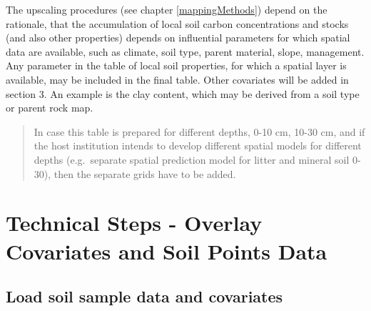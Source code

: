\documentclass[10pt,b5paper,]{book}
\newenvironment{Shaded}{\begin{snugshade}}{\end{snugshade}}
\newcommand{\CommentTok}[1]{\textcolor[rgb]{0.56,0.35,0.01}{\textit{#1}}}
\newcommand{\DataTypeTok}[1]{\textcolor[rgb]{0.13,0.29,0.53}{#1}}
\newcommand{\KeywordTok}[1]{\textcolor[rgb]{0.13,0.29,0.53}{\textbf{#1}}}
\newcommand{\NormalTok}[1]{#1}
\newcommand{\OtherTok}[1]{\textcolor[rgb]{0.56,0.35,0.01}{#1}}
\newcommand{\StringTok}[1]{\textcolor[rgb]{0.31,0.60,0.02}{#1}}
\theoremstyle{definition}
\theoremstyle{definition}
\theoremstyle{definition}
\theoremstyle{remark}
\begin{document}
The upscaling procedures (see chapter \ref{mappingMethods}) depend on
the rationale, that the accumulation of local soil carbon concentrations
and stocks (and also other properties) depends on influential parameters
for which spatial data are available, such as climate, soil type, parent
material, slope, management. Any parameter in the table of local soil
properties, for which a spatial layer is available, may be included in
the final table. Other covariates will be added in section 3. An example
is the clay content, which may be derived from a soil type or parent
rock map.

\begin{quote}
In case this table is prepared for different depths, 0-10 cm, 10-30 cm,
and if the host institution intends to develop different spatial models
for different depths (e.g.~separate spatial prediction model for litter
and mineral soil 0-30), then the separate grids have to be added.
\end{quote}

\hypertarget{overlay-soil-covariates}{%
\section{Technical Steps - Overlay Covariates and Soil Points
Data}\label{overlay-soil-covariates}}

\hypertarget{load-soil-sample-data-and-covariates}{%
\subsection{Load soil sample data and
covariates}\label{load-soil-sample-data-and-covariates}}

\begin{Shaded}
\end{Shaded}
\end{document}
